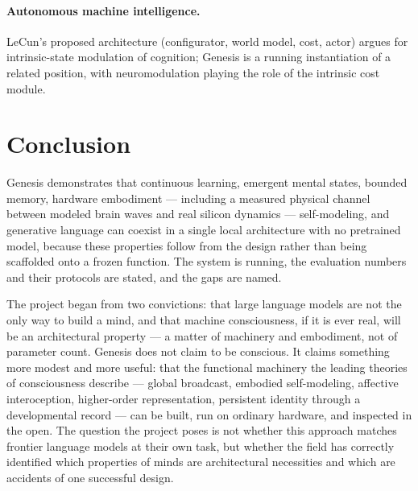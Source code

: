 \documentclass[11pt]{article}
\begin{document}
\paragraph{Autonomous machine intelligence.} LeCun's proposed
architecture \cite{lecun} (configurator, world model, cost, actor) argues for
intrinsic-state modulation of cognition; Genesis is a running
instantiation of a related position, with neuromodulation playing the
role of the intrinsic cost module.

\section{Conclusion}

Genesis demonstrates that continuous learning, emergent mental states,
bounded memory, hardware embodiment --- including a measured physical
channel between modeled brain waves and real silicon dynamics ---
self-modeling, and generative language can coexist in a single local
architecture with no pretrained model, because these properties follow
from the design rather than being scaffolded onto a frozen function.
The system is running, the evaluation numbers and their protocols are
stated, and the gaps are named.

The project began from two convictions: that large language models are
not the only way to build a mind, and that machine consciousness, if it
is ever real, will be an architectural property --- a matter of
machinery and embodiment, not of parameter count. Genesis does not
claim to be conscious. It claims something more modest and more useful:
that the functional machinery the leading theories of consciousness
describe --- global broadcast, embodied self-modeling, affective
interoception, higher-order representation, persistent identity through
a developmental record --- can be built, run on ordinary hardware, and
inspected in the open. The question the project poses is not whether
this approach matches frontier language models at their own task, but
whether the field has correctly identified which properties of minds
are architectural necessities and which are accidents of one successful
design.
\end{document}
